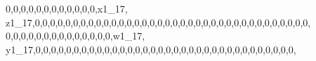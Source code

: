 \documentclass[]{article}
\newenvironment{Shaded}{\begin{snugshade}}{\end{snugshade}}
\newcommand{\DecValTok}[1]{\textcolor[rgb]{0.00,0.00,0.81}{#1}}
\newcommand{\NormalTok}[1]{#1}
\begin{document}
\begin{Shaded}
\begin{Highlighting}[]
\DecValTok{0}\NormalTok{,}\DecValTok{0}\NormalTok{,}\DecValTok{0}\NormalTok{,}\DecValTok{0}\NormalTok{,}\DecValTok{0}\NormalTok{,}\DecValTok{0}\NormalTok{,}\DecValTok{0}\NormalTok{,}\DecValTok{0}\NormalTok{,}\DecValTok{0}\NormalTok{,}\DecValTok{0}\NormalTok{,}\DecValTok{0}\NormalTok{,}\DecValTok{0}\NormalTok{,x1_}\DecValTok{17}\NormalTok{, z1_}\DecValTok{17}\NormalTok{,}\DecValTok{0}\NormalTok{,}\DecValTok{0}\NormalTok{,}\DecValTok{0}\NormalTok{,}\DecValTok{0}\NormalTok{,}\DecValTok{0}\NormalTok{,}\DecValTok{0}\NormalTok{,}\DecValTok{0}\NormalTok{,}\DecValTok{0}\NormalTok{,}\DecValTok{0}\NormalTok{,}\DecValTok{0}\NormalTok{,}\DecValTok{0}\NormalTok{,}\DecValTok{0}\NormalTok{,}\DecValTok{0}\NormalTok{,}\DecValTok{0}\NormalTok{,}\DecValTok{0}\NormalTok{,}\DecValTok{0}\NormalTok{,}\DecValTok{0}\NormalTok{,}\DecValTok{0}\NormalTok{,}\DecValTok{0}\NormalTok{,}\DecValTok{0}\NormalTok{,}\DecValTok{0}\NormalTok{,}\DecValTok{0}\NormalTok{,}\DecValTok{0}\NormalTok{,}\DecValTok{0}\NormalTok{,}\DecValTok{0}\NormalTok{,}\DecValTok{0}\NormalTok{,}\DecValTok{0}\NormalTok{,}\DecValTok{0}\NormalTok{,}\DecValTok{0}\NormalTok{,}\DecValTok{0}\NormalTok{,}\DecValTok{0}\NormalTok{,}\DecValTok{0}\NormalTok{,}\DecValTok{0}\NormalTok{,}\DecValTok{0}\NormalTok{,}\DecValTok{0}\NormalTok{,}\DecValTok{0}\NormalTok{,}
\DecValTok{0}\NormalTok{,}\DecValTok{0}\NormalTok{,}\DecValTok{0}\NormalTok{,}\DecValTok{0}\NormalTok{,}\DecValTok{0}\NormalTok{,}\DecValTok{0}\NormalTok{,}\DecValTok{0}\NormalTok{,}\DecValTok{0}\NormalTok{,}\DecValTok{0}\NormalTok{,}\DecValTok{0}\NormalTok{,}\DecValTok{0}\NormalTok{,}\DecValTok{0}\NormalTok{,}\DecValTok{0}\NormalTok{,}\DecValTok{0}\NormalTok{,w1_}\DecValTok{17}\NormalTok{, y1_}\DecValTok{17}\NormalTok{,}\DecValTok{0}\NormalTok{,}\DecValTok{0}\NormalTok{,}\DecValTok{0}\NormalTok{,}\DecValTok{0}\NormalTok{,}\DecValTok{0}\NormalTok{,}\DecValTok{0}\NormalTok{,}\DecValTok{0}\NormalTok{,}\DecValTok{0}\NormalTok{,}\DecValTok{0}\NormalTok{,}\DecValTok{0}\NormalTok{,}\DecValTok{0}\NormalTok{,}\DecValTok{0}\NormalTok{,}\DecValTok{0}\NormalTok{,}\DecValTok{0}\NormalTok{,}\DecValTok{0}\NormalTok{,}\DecValTok{0}\NormalTok{,}\DecValTok{0}\NormalTok{,}\DecValTok{0}\NormalTok{,}\DecValTok{0}\NormalTok{,}\DecValTok{0}\NormalTok{,}\DecValTok{0}\NormalTok{,}\DecValTok{0}\NormalTok{,}\DecValTok{0}\NormalTok{,}\DecValTok{0}\NormalTok{,}\DecValTok{0}\NormalTok{,}\DecValTok{0}\NormalTok{,}\DecValTok{0}\NormalTok{,}\DecValTok{0}\NormalTok{,}\DecValTok{0}\NormalTok{,}\DecValTok{0}\NormalTok{,}\DecValTok{0}\NormalTok{,}\DecValTok{0}\NormalTok{,}\DecValTok{0}\NormalTok{,}\DecValTok{0}\NormalTok{,}

\end{Highlighting}
\end{Shaded}
\end{document}
